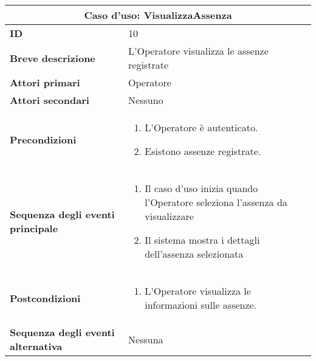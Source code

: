 \documentclass[a4paper]{report}
\begin{document}
\clearpage
\begin{table}[H]
\vspace*{-0cm}
\renewcommand{\arraystretch}{1.9}
\begin{tabular}{|p{3.9cm}|p{9.9cm}|}
\hline
\multicolumn{2}{|c|}{\textbf{Caso d’uso: VisualizzaAssenza}} \\ \hline
\textbf{ID} & 10 \\ \hline
\textbf{Breve descrizione} & L’Operatore visualizza le assenze registrate \\ \hline
\textbf{Attori primari} & Operatore \\ \hline
\textbf{Attori secondari} & Nessuno \\ \hline
\textbf{Precondizioni} & \begin{enumerate}[leftmargin=14pt,label=\arabic*.,labelsep=0.5em,topsep=0pt,partopsep=0pt,parsep=0pt,itemsep=0pt]
    \item L’Operatore è autenticato.
    \item Esistono assenze registrate.
\end{enumerate} \\ \hline
\textbf{Sequenza degli eventi principale} & \begin{enumerate}[leftmargin=14pt,label=\arabic*.,labelsep=0.5em,topsep=0pt,partopsep=0pt,parsep=0pt,itemsep=0pt]
    \item Il caso d’uso inizia quando l’Operatore seleziona l'assenza da visualizzare
    \item Il sistema mostra i dettagli dell’assenza selezionata
\end{enumerate} \\ \hline
\textbf{Postcondizioni} & \begin{enumerate}[label=\arabic*.,leftmargin=14pt,labelsep=0.5em,topsep=0pt,partopsep=0pt,parsep=0pt,itemsep=0pt]
        \item L’Operatore visualizza le informazioni sulle assenze.
\end{enumerate} \\ \hline
\textbf{Sequenza degli eventi alternativa} & Nessuna \\ \hline
\end{tabular}
\end{table}
\end{document}
